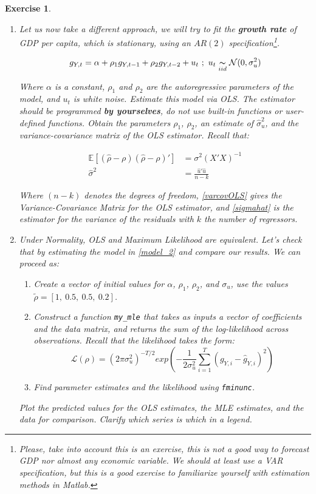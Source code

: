 \documentclass[a4paper,12pt]{article}
\newtheorem{exercise}{Exercise}
\begin{document}
\begin{exercise}
\begin{enumerate}
	\item Let us now take a different approach, we will try to fit the \textbf{growth rate} of GDP per capita, which is stationary, using an $AR(2)$ specification\footnote{Please, take into account this is an exercise, this is not a good way to forecast GDP nor almost any economic variable. We should \textit{at least} use a VAR specification, but this is a good exercise to familiarize yourself with estimation methods in Matlab.}. 
	
		\begin{equation}
		g_{Y,t} = \alpha + \rho_1 g_{Y,t-1} + \rho_2 g_{Y,t-2} + u_t \ ; \ u_t \underset{iid}{\thicksim} \mathcal{N}(0, \sigma^2_u)
		\label{model_2}
		\end{equation}
		
	Where $\alpha$ is a constant, $\rho_1$ and $\rho_2$ are the autoregressive parameters of the model, and $u_t$ is white noise. Estimate this model via OLS. The estimator should be programmed \textbf{by yourselves}, do not use built-in functions or user-defined functions. Obtain the parameters $\rho_1$, $\rho_2$, an estimate of $\hat{\sigma}^2_u$, and the variance-covariance matrix of the OLS estimator. Recall that:
		
		\begin{align}
		\mathbb{E}\left[(\hat{\rho}-\rho)(\hat{\rho}-\rho)'\right] &= \sigma^2\left(X'X\right)^{-1} \label{varcovOLS}\\
		\hat{\sigma}^2 &= \frac{\hat{u}' \hat{u}}{n-k} \label{sigmahat}
		\end{align}
		
	Where $(n-k)$ denotes the degrees of freedom, \eqref{varcovOLS} gives the Variance-Covariance Matrix for the OLS estimator, and \eqref{sigmahat} is the estimator for the variance of the residuals with $k$ the number of regressors.
	
	\item Under Normality, OLS and Maximum Likelihood are equivalent. Let's check that by estimating the model in \eqref{model_2} and compare our results. We can proceed as:
	\begin{enumerate}
		\item Create a vector of initial values for $\alpha$, $\rho_1$, $\rho_2$, and $\sigma_u$, use the values $\tilde{\rho} = \left[1 , \ 0.5 , \ 0.5, \  0.2\right]$.
		\item Construct a function \texttt{my_mle} that takes as inputs a vector of coefficients and the data matrix, and returns the sum of the log-likelihood across observations. Recall that the likelihood takes the form:
		\[
		\mathcal{L}(\rho) = \left(2\pi \sigma_u^2\right)^{-T/2} exp\left(-\frac{1}{2\sigma_u^2}\sum^T_{i=1} \left(g_{Y,i} - \hat{g}_{Y,i} \right)^2\right)
		\]
		\item Find parameter estimates and the likelihood using \texttt{fminunc}.	
	\end{enumerate}
	
	Plot the predicted values for the OLS estimates, the MLE estimates, and the data for comparison. Clarify which series is which in a legend.
\end{enumerate}
\end{exercise}
\end{document}
